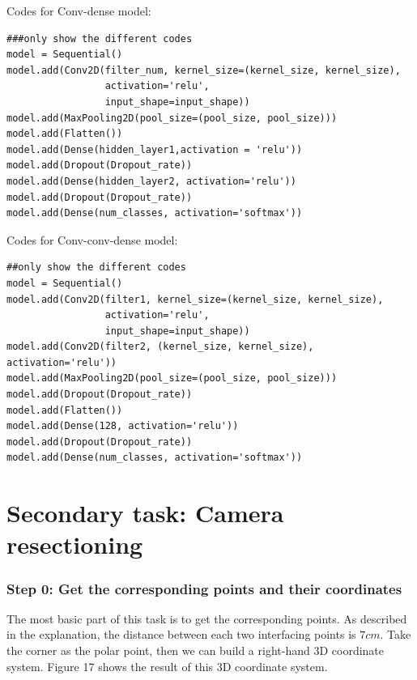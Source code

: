 \documentclass{article}
\begin{document}
Codes for Conv-dense model:
\begin{lstlisting}
###only show the different codes
model = Sequential()
model.add(Conv2D(filter_num, kernel_size=(kernel_size, kernel_size),
                 activation='relu',
                 input_shape=input_shape))
model.add(MaxPooling2D(pool_size=(pool_size, pool_size)))
model.add(Flatten())
model.add(Dense(hidden_layer1,activation = 'relu'))
model.add(Dropout(Dropout_rate))
model.add(Dense(hidden_layer2, activation='relu'))
model.add(Dropout(Dropout_rate))
model.add(Dense(num_classes, activation='softmax'))
\end{lstlisting}

Codes for Conv-conv-dense model:
\begin{lstlisting}
##only show the different codes
model = Sequential()
model.add(Conv2D(filter1, kernel_size=(kernel_size, kernel_size),
                 activation='relu',
                 input_shape=input_shape))
model.add(Conv2D(filter2, (kernel_size, kernel_size), activation='relu'))
model.add(MaxPooling2D(pool_size=(pool_size, pool_size)))
model.add(Dropout(Dropout_rate))
model.add(Flatten())
model.add(Dense(128, activation='relu'))
model.add(Dropout(Dropout_rate))
model.add(Dense(num_classes, activation='softmax'))

\end{lstlisting}

\section*{Secondary task: Camera resectioning}

\subsubsection*{Step 0: Get the corresponding points and their coordinates}

The most basic part of this task is to get the corresponding points. As described in the explanation, the distance between each two interfacing points is $7cm$. Take the corner as the polar point, then we can build a right-hand 3D coordinate system. Figure 17 shows the result of this 3D coordinate system. 
\end{document}
